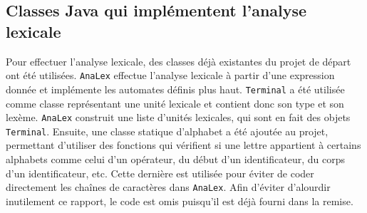 \subsection{Classes Java qui implémentent l’analyse lexicale}

Pour effectuer l'analyse lexicale, des classes déjà existantes du projet de
départ ont été utilisées. \verb|AnaLex| effectue l’analyse lexicale à partir
d’une expression donnée et implémente les automates définis plus haut.
\verb|Terminal| a été utilisée comme classe représentant une unité lexicale
et contient donc son type et son lexème. \verb|AnaLex| construit une liste
d’unités lexicales, qui sont en fait des objets \verb|Terminal|. Ensuite, une
classe statique d’alphabet a été ajoutée au projet, permettant d’utiliser des
fonctions qui vérifient si une lettre appartient à certains alphabets comme
celui d’un opérateur, du début d’un identificateur, du corps d’un
identificateur, etc. Cette dernière est utilisée pour éviter de coder
directement les chaînes de caractères dans \verb|AnaLex|. Afin d'éviter
d'alourdir inutilement ce rapport, le code est omis puisqu’il est déjà
fourni dans la remise.

